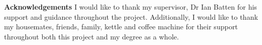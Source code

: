 {\huge\textbf{Acknowledgements}}
\vspace{0.7cm}
\newline
I would like to thank my supervisor, Dr Ian Batten for his support and guidance throughout the project.
Additionally, I would like to thank my housemates, friends, family, kettle and coffee machine for their support throughout both this project and my degree as a whole.
